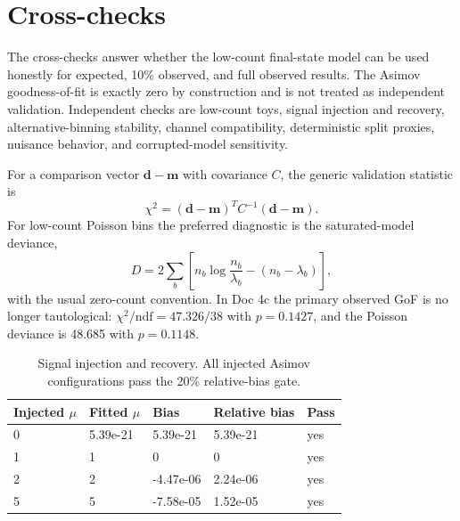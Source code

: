 \documentclass[11pt]{article}
\begin{document}
\section{Cross-checks}
The cross-checks answer whether the low-count final-state model can be used honestly for expected, 10\% observed, and full observed results. The Asimov goodness-of-fit is exactly zero by construction and is not treated as independent validation. Independent checks are low-count toys, signal injection and recovery, alternative-binning stability, channel compatibility, deterministic split proxies, nuisance behavior, and corrupted-model sensitivity.

For a comparison vector $\mathbf{d}-\mathbf{m}$ with covariance $C$, the generic validation statistic is
\begin{equation}
 \chi^2=(\mathbf{d}-\mathbf{m})^T C^{-1}(\mathbf{d}-\mathbf{m}).
 \label{eq:chi2}
\end{equation}
For low-count Poisson bins the preferred diagnostic is the saturated-model deviance,
\begin{equation}
 D = 2\sum_b \left[n_b\log\frac{n_b}{\lambda_b} - (n_b-\lambda_b)\right],
 \label{eq:poisson-deviance}
\end{equation}
with the usual zero-count convention. In Doc 4c the primary observed GoF is no longer tautological: $\chi^2/\mathrm{ndf}=47.326/38$ with $p=0.1427$, and the Poisson deviance is 48.685 with $p=0.1148$.

\begin{table}[htbp]
\centering
\caption{Signal injection and recovery. All injected Asimov configurations pass the 20\% relative-bias gate.}
\begin{tabular}{lllll}
\toprule
Injected $\mu$ & Fitted $\mu$ & Bias & Relative bias & Pass \\
\midrule
0 & 5.39e-21 & 5.39e-21 & 5.39e-21 & yes \\
1 & 1 & 0 & 0 & yes \\
2 & 2 & -4.47e-06 & 2.24e-06 & yes \\
5 & 5 & -7.58e-05 & 1.52e-05 & yes \\
\bottomrule
\end{tabular}
\label{tab:injection}
\end{table}
\end{document}
